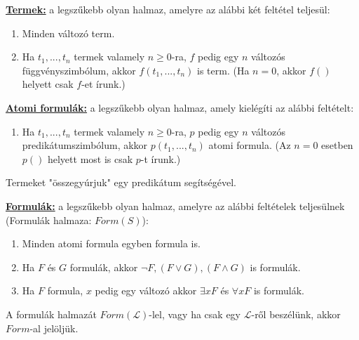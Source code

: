\begin{frame}
\begin{tcolorbox}[title={Az $\mathcal{L}$ elsőrendű nyelv formulái}]
\underline{\textbf{Termek:}} a legszűkebb olyan halmaz, amelyre az alábbi két feltétel teljesül:\\
\begin{enumerate}
\item Minden változó term.
\item Ha $t_1, ..., t_n$ termek valamely $n \geq 0$-ra, $f$ pedig egy $n$ változós függvényszimbólum,
akkor $f(t_1, ..., t_n)$ is term. (Ha $n = 0$, akkor $f()$ helyett csak $f$-et írunk.)
\end{enumerate}
\mmedskip

\underline{\textbf{Atomi formulák:}} a legszűkebb olyan halmaz, amely kielégíti az alábbi feltételt:\\
\begin{enumerate}
\item Ha $t_1, ..., t_n$ termek valamely $n \geq 0$-ra, $p$ pedig egy $n$ változós predikátumszimbólum, akkor $p(t_1, ..., t_n)$ atomi formula. (Az $n = 0$ esetben $p()$ helyett most is csak $p$-t írunk.)
\end{enumerate}
{\small Termeket "összegyúrjuk" egy predikátum segítségével.}\\
\mmedskip

\underline{\textbf{Formulák:}} a legszűkebb olyan halmaz, amelyre az alábbi feltételek teljesülnek (Formulák halmaza: $Form(S)$):\\
\begin{enumerate}
\item Minden atomi formula egyben formula is.
\item Ha $F$ és $G$ formulák, akkor ${\neg}F, (F \lor G), (F \land G)$ is formulák.
\item Ha $F$ formula, $x$ pedig egy változó akkor ${\exists}xF$ és ${\forall}xF$ is formulák.
\end{enumerate}
\mmedskip

A formulák halmazát $Form(\mathcal{L})$-lel, vagy ha csak egy $\mathcal{L}$-ről beszélünk, akkor $Form$-al jelöljük.
\end{tcolorbox}

\end{frame}

